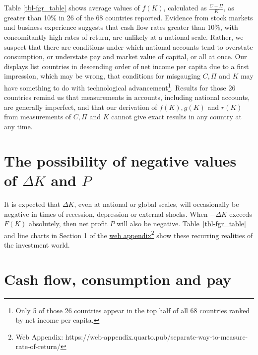 Table \ref{tbl-fgr_table} shows average values of \(f(K)\), calculated as \(\frac{C-\Pi}{K}\), as greater than 10\% in 26 of the 68 countries reported. 
Evidence from stock markets and business experience suggests that cash flow rates greater than 10\%, with concomitantly high rates of return, are unlikely at a national scale. Rather, we suspect that there are conditions under which national accounts tend to overstate consumption, or understate pay and market value of capital, or all at once. Our displays list countries in descending order of net income per capita due to a first impression, which may be wrong, that conditions for misgauging \(C, \Pi\) and \(K\) may have something to do with technological advancement\footnote{Only 5 of those 26 countries appear in the top half of all 68 countries ranked by net income per capita.}. Results for those 26 countries remind us that measurements in accounts, including national accounts, are generally imperfect, and that our derivation of \(f(K), g(K)\) and \(r(K)\) from measurements of \(C, \Pi\) and \(K\) cannot give exact results in any country at any time.




\section{The possibility of negative values of $\Delta K$ and $P$}

It is expected that \(\Delta K\), even at national or global scales, will occasionally be negative in times of recession, depression or external shocks. When \(- \Delta K\) exceeds \(F(K)\) absolutely, then net profit $P$ will also be negative. Table~\ref{tbl-fgr_table} and line charts in Section 1 of the \href{https://web-appendix.quarto.pub/separate-way-to-measure-rate-of-return/}{web appendix}\footnote{Web Appendix: https://web-appendix.quarto.pub/separate-way-to-measure-rate-of-return/} show these recurring realities of the investment world.


\section{Cash flow, consumption and pay}

